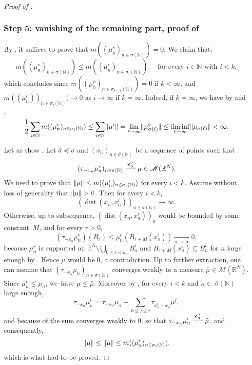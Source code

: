 \documentclass[10pt]{amsart}
\theoremstyle{plain}
\theoremstyle{definition}
\newcommand{\N}{\mathbb{N}}
\newcommand{\R}{\mathbb{R}}
\newcommand{\Cspace}{\mathscr{C}}
\newcommand{\Mspace}{\mathscr{M}}
\DeclarePairedDelimiter{\norm}{\lVert}{\rVert}
\DeclareMathOperator{\dist}{dist}
\newcommand{\mweakto}{\xrightharpoonup{\Cspace_0'}}
\newcommand{\xto}[2][]{\xrightarrow[#2]{#1}}
\let\oldbigcup\bigcup
\begin{document}
\begin{proof}[Proof of ]
\subsubsection*{Step 5: vanishing of the remaining part, proof of }
By , it suffices to prove that \(m((\mu^v_n)_{n\in\sigma(\N)})=0\). We claim that:
\begin{equation}\label{bubbleConcentrationEstimate}
m((\mu^v_n)_{n\in\sigma(\N)})\le m((\mu^i_n)_{n\in\sigma_i(\N)}),\quad\text{for every \(i\in\N\) with \(i< k\)},
\end{equation}
which concludes since \(m((\mu^k_n)_{n\in\sigma_{k-1}(\N)})=0\) if \(k<\infty\), and \(m((\mu^i_n))_{n\in\sigma_i(\N)})\to 0\) as \(i\to\infty\) if \(k=\infty\). Indeed, if \(k=\infty\), we have by  and ,
\[
\frac 12\sum_{i\in\N}m((\mu^i_n)_{n\in\sigma_i(\N)})\le\sum_{i\in\N}\norm{\mu^i}= \lim_{\ell\to\infty} \norm{\mu_{\sigma(\ell)}^b} \leq \liminf_{\ell\to\infty}\norm{\mu_{\sigma(\ell)}}<\infty.
\]

Let us show . Let \(\bar\sigma\preceq\sigma\) and \((x_n)_{n\in\bar\sigma(\N)}\) be a sequence of points such that
\[
(\tau_{-x_n}\mu^v_n)_{n\in\bar\sigma(\N)}\mweakto \mu\in\Mspace(\R^N).
\]
We need to prove that \(\norm{\mu}\le m((\mu^i_n)_{n\in \sigma_i(\N)})\) for every $i <k$. Assume without loss of generality that \(\norm{\mu}>0\). Then for every \(i<k\),
\begin{equation}\label{distanceDiverge}
(\dist(x_n,x^i_n))_{n\in\bar\sigma(\N)}\to\infty.
\end{equation}
Otherwise, up to subsequence, $(\dist(x_n,x_n^i))_n$ would be bounded by some constant~$M$, and for every $r > 0$,
\[(\tau_{-x_n} \mu_n^v)(B_r) \leq \mu_n^v(B_{r+M}(x^i_n)) \xto{n\to\infty} 0,\]
because \(\mu^v_n\) is supported on \(\R^N\setminus\oldbigcup_{0\le i<k_n}B^i_n\) and $B_{r+M}(x^i_n) \subseteq B^i_n$ for $n$ large enough by . Hence \(\mu\) would be \(0\), a contradiction. Up to further extraction, one can assume that \((\tau_{-x_n}\mu_n)_{n\in\bar\sigma(\N)}\) converges weakly to a measure \(\bar\mu \in \Mspace(\R^N)\). Since \(\mu^v_n\le\mu_n\), we~have \(\mu\le\bar\mu\). Moreover by , for every \(i < k\) and \(n\in\ \bar\sigma(\N)\) large enough,
\[
\tau_{-x_n}\mu^i_n=\tau_{-x_n}\mu_n-\sum_{0\le j\leq i}\tau_{x^j_n-x_n}\mu^j,
\]
and because of  the sum converges weakly to $0$, so that $\tau_{-x_n} \mu_n^i \mweakto \bar \mu$, and consequently,
\[
\norm{\mu}\le\norm{\bar\mu}\le m((\mu^i_n)_{n\in\sigma_i(\N)}),
\]
which is what had to be proved.


\end{proof}
\end{document}
